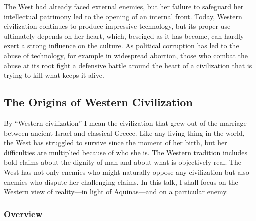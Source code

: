 \documentclass[twocolumn]{article}
\begin{document}
The West had already faced external enemies, but her failure to safeguard her
intellectual patrimony led to the opening of an internal front.  Today, Western
civilization continues to produce impressive technology, but its proper use
ultimately depends on her heart, which, beseiged as it has become, can hardly
exert a strong influence on the culture. As political corruption has led to the
abuse of technology, for example in widespread abortion, those who combat the
abuse at its root fight a defensive battle around the heart of a civilization
that is trying to kill what keeps it alive.

\subsection{The Origins of Western Civilization}

By ``Western civilization'' I mean the civilization that grew out of the
marriage between ancient Israel and classical Greece.  Like any living thing in
the world, the West has struggled to survive since the moment of her birth, but
her difficulties are multiplied because of who she is.  The Western tradition
includes bold claims about the dignity of man and about what is objectively
real.  The West has not only enemies who might naturally oppose any
civilization but also enemies who dispute her challenging claims.  In this
talk, I shall focus on the Western view of reality---in light of Aquinas---and
on a particular enemy.

\subsubsection{Overview}
\end{document}
